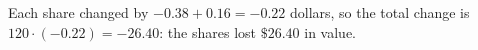 Each share changed by $-0.38+0.16=-0.22$ dollars, so the total change is $120\cdot(-0.22)=-26.40$: the shares lost $\boxed{\$26.40}$ in value.
